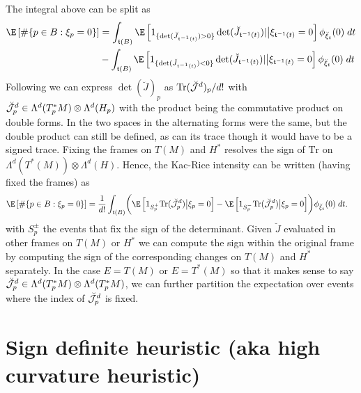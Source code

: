 \documentclass{article}
\newcommand{\randsec}{\xi}
\begin{document}
\begin{eqaution}
The integral above can be split as
$$
\begin{aligned}
\E \left[\# \{p \in B: \randsec_p=0\} \right] &= \int_{\coordchart(B)} \E \left[1_{\{\det(\breve{J}_{\coordchart^{-1}(t)}) > 0\}}\det(\breve{J}_{\coordchart^{-1}(t)})| \bigr | \randsec_{\coordchart^{-1}(t)}=0 \right] \phi_{\breve{\randsec}_t}(0) \; dt \\
& - \int_{\coordchart(B)} \E \left[1_{\{\det(\breve{J}_{\coordchart^{-1}(t)}) < 0\}}\det(\breve{J}_{\coordchart^{-1}(t)})| \bigr | \randsec_{\coordchart^{-1}(t)}=0 \right] \phi_{\breve{\randsec}_t}(0) \; dt \\
\end{aligned}
$$
Following \cite{ECmanifolds,Federer} we can express $\det(\breve{J})_p$ as $\text{Tr}(\breve{\cal J}^d)_p/d!$
with $\breve{\cal J}^d_p \in \Lambda^d(T^*_pM) \otimes \Lambda^d(H_p)$ with the product being
the commutative product on double forms. In \cite{ECmanifolds,Federer} the two spaces in the alternating
forms were the same, but the double product can still be defined, as can its trace though it would have to be
a signed trace. Fixing the frames on $T(M)$ and $H^*$ resolves the sign of $\text{Tr}$ on
$\Lambda^d(T^*(M)) \otimes \Lambda^d(H)$. Hence, the
Kac-Rice intensity can be written (having fixed the frames) as
$$
\begin{aligned}
\E \left[\# \{p \in B: \randsec_p=0\} \right] &= \frac{1}{d!} \int_{\coordchart(B)} \biggl( \E \left[1_{S^+_p} \text{Tr}(\breve{\cal J}_p^d) \bigl| \randsec_p=0\right]   - \E \left[1_{S^-_p} \text{Tr}(\breve{\cal J}_p^d) \bigl| \randsec_p=0\right] \biggr) \phi_{\breve{\randsec}_t}(0) \; dt.
\end{aligned}
$$
with $S^{\pm}_p$ the events that fix the sign of the determinant.
Given $\breve{J}$ evaluated in other frames on $T(M)$ or $H^*$ we can compute the sign within the original frame by computing the sign of the corresponding changes on $T(M)$ and $H^*$ separately.
In the case $E=T(M)$ or $E=T^*(M)$ so that
it makes sense to say $\breve{\cal J}^d_p \in \Lambda^d(T^*_pM) \otimes \Lambda^d(T^*_pM)$, we can further partition the expectation over events where the index of $\breve{\cal J}^d_p$ is fixed.

\section{Sign definite heuristic (aka high curvature heuristic)}


\end{eqaution}
\end{document}
